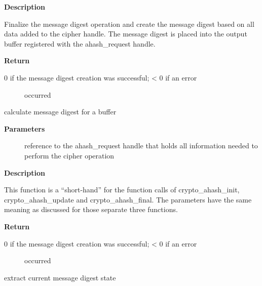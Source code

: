 \documentclass[a4paper,8pt,english]{sphinxmanual}
\begin{document}
\textbf{Description}

Finalize the message digest operation and create the message digest
based on all data added to the cipher handle. The message digest is placed
into the output buffer registered with the ahash\_request handle.

\textbf{Return}
\begin{description}
\item[{0 if the message digest creation was successful; \textless{} 0 if an error}] \leavevmode
occurred

\end{description}

\begin{fulllineitems}
\label{crypto/api-digest:c.crypto_ahash_digest}
calculate message digest for a buffer

\end{fulllineitems}


\textbf{Parameters}
\begin{description}
\item[{}] \leavevmode
reference to the ahash\_request handle that holds all information
needed to perform the cipher operation

\end{description}

\textbf{Description}

This function is a ``short-hand'' for the function calls of crypto\_ahash\_init,
crypto\_ahash\_update and crypto\_ahash\_final. The parameters have the same
meaning as discussed for those separate three functions.

\textbf{Return}
\begin{description}
\item[{0 if the message digest creation was successful; \textless{} 0 if an error}] \leavevmode
occurred

\end{description}

\begin{fulllineitems}
\label{crypto/api-digest:c.crypto_ahash_export}
extract current message digest state

\end{fulllineitems}
\end{document}
